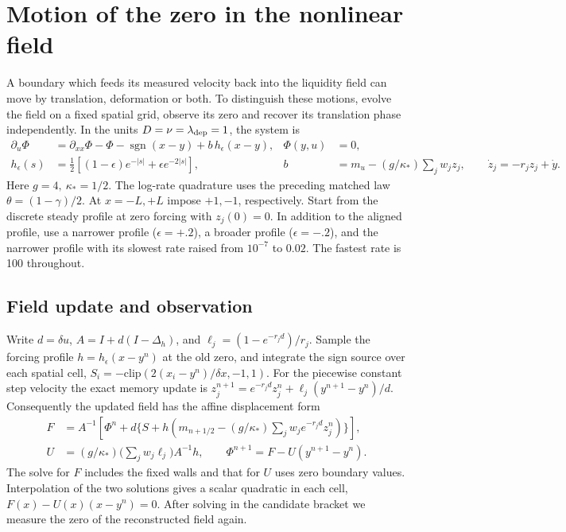 \documentclass[11pt]{article}
\begin{document}
\section{Motion of the zero in the nonlinear field}\label{sec:nonlinear-field}
A boundary which feeds its measured velocity back into the liquidity field can
move by translation, deformation or both. To distinguish these motions, evolve
the field on a fixed spatial grid, observe its zero and recover its translation
phase independently. In the units \(D=\nu=\lambda_{\rm dep}=1\), the system is
\begin{align}
 \partial_u\Phi &= \partial_{xx}\Phi-\Phi-\operatorname{sgn}(x-y)
                         + b\,h_\epsilon(x-y), & \Phi(y,u)&=0,\\
 h_\epsilon(s)&=\tfrac12[(1-\epsilon)e^{-|s|}+\epsilon e^{-2|s|}],&
 b &= m_u-(g/\kappa_*)\sum_j w_j z_j,\qquad
 \dot z_j=-r_jz_j+\dot y .\label{eq:nonlinear-feedback}
\end{align}
Here \(g=4,\ \kappa_*=1/2\). The log-rate quadrature uses the preceding
matched law \(\theta=(1-\gamma)/2\). At \(x=-L,+L\) impose \(+1,-1\),
respectively. Start from the discrete steady profile at zero forcing
with \(z_j(0)=0\). In addition to the aligned profile, use a narrower
profile (\(\epsilon=+.2\)), a broader profile (\(\epsilon=-.2\)), and
the narrower profile with its slowest rate raised from \(10^{-7}\) to
\(0.02\). The fastest rate is 100 throughout.

\subsection{Field update and observation}
Write \(d=\delta u\), \(A=I+d(I-\Delta_h)\), and
\(\ell_j=(1-e^{-r_jd})/r_j\). Sample the forcing profile \(h=h_\epsilon(x-y^n)\)
at the old zero, and integrate the sign source over each spatial cell,
\(S_i=-\mathrm{clip}(2(x_i-y^n)/\delta x,-1,1)\).
For the piecewise constant step velocity the exact memory update is
\(z_j^{n+1}=e^{-r_jd}z_j^n+\ell_j(y^{n+1}-y^n)/d\).
Consequently the updated field has the affine displacement form
\begin{align}
 F &= A^{-1}\!\left[\Phi^n+d\{S+h(m_{n+1/2}
       -(g/\kappa_*)\textstyle\sum_j w_j e^{-r_jd}z_j^n)\}\right],\\
 U &= (g/\kappa_*)\Big(\textstyle\sum_j w_j\ell_j\Big)A^{-1}h,\qquad
 \Phi^{n+1}=F-U(y^{n+1}-y^n).
\end{align}
The solve for \(F\) includes the fixed walls and that for \(U\) uses
zero boundary values. Interpolation of the two solutions gives a scalar
quadratic in each cell, \(F(x)-U(x)(x-y^n)=0\). After solving in the
candidate bracket we measure the zero of the reconstructed field again.
\end{document}
